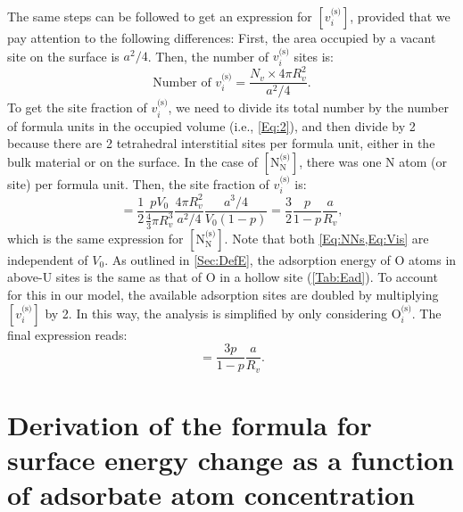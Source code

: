 \documentclass[preprint,12pt,sort&compress]{elsarticle}
\newcommand{\?}{\stackrel{?}{=}}
\begin{document}
The same steps can be followed to get an expression for $[v_i^\text{(s)}]$, provided that we pay attention to the following differences: First, the area occupied by a vacant site on the surface is $a^2/4$. Then, the number of $v_i^\text{(s)}$ sites is:
\begin{equation}
\text{Number of } v_i^\text{(s)} = \frac{ N_v \times 4 \pi R_v^2 } { a^2 / 4 }.
\end{equation}
To get the site fraction of $v_i^\text{(s)}$, we need to divide its total number by the number of formula units in the occupied volume (i.e., \cref{Eq:2}), and then divide by 2 because there are 2 tetrahedral interstitial sites per formula unit, either in the bulk material or on the surface. In the case of $[ \text{N}_\text{N}^\text{(s)} ]$, there was one N atom (or site) per formula unit. Then, the site fraction of $v_i^\text{(s)}$ is: 
\begin{equation}
[ v_i^\text{(s)} ] = \frac{1}{2} \frac{p V_0}{ \frac{4}{3} \pi R_v^3 } \frac{4 \pi R_v^2}{ a^2/4}  \frac{ a^3/4 }{ V_0 (1 - p) } = \frac{3}{2} \frac{p}{1-p} \frac{a}{R_v},
\label{Eq:Vis}
\end{equation}
which is the same expression for $[ \text{N}_\text{N}^\text{(s)} ]$. Note that both \cref{Eq:NNs,Eq:Vis} are independent of $V_0$. As outlined in \cref{Sec:DefE}, the adsorption energy of O atoms in above-U sites is the same as that of O in a hollow site (\cref{Tab:Ead}). To account for this in our model, the available adsorption sites are doubled by multiplying $[ v_i^\text{(s)} ]$ by 2. In this way, the analysis is simplified by only considering $\text{O}_i^{\text{(s)}}$. The final expression reads:
\begin{equation}
[v_i^{\text{(s)}}] = \frac{3p}{1-p} \frac{a}{R_v}.
\end{equation}

\section{Derivation of the formula for surface energy change as a function of adsorbate atom concentration}
\label{App2}
\end{document}
